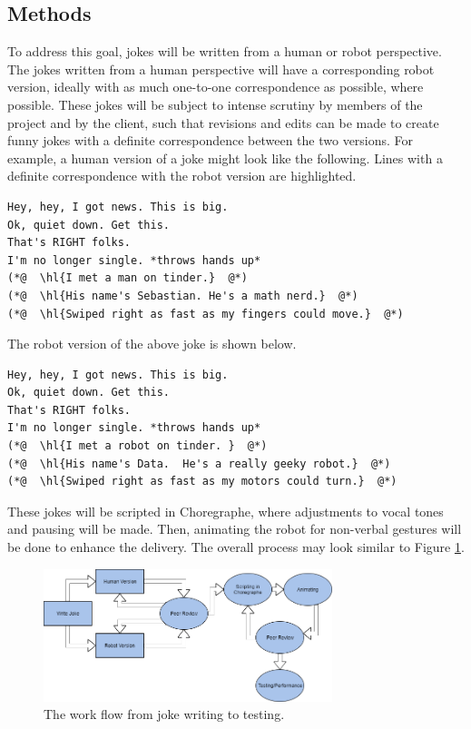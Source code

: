 \documentclass[onecolumn, draftclsnofoot,10pt, compsoc]{IEEEtran}
\begin{document}
\subsection{Methods}
To address this goal, jokes will be written from a human or robot perspective.
The jokes written from a human perspective will have a corresponding robot version, ideally with as much one-to-one correspondence as possible, where possible.
These jokes will be subject to intense scrutiny by members of the project and by the client, such that revisions and edits can be made to create funny jokes with a definite correspondence between the two versions.
For example, a human version of a joke might look like the following. Lines with a definite correspondence with the robot version are highlighted.

\begin{lstlisting}
Hey, hey, I got news. This is big.
Ok, quiet down. Get this.
That's RIGHT folks.
I'm no longer single. *throws hands up*
(*@  \hl{I met a man on tinder.}  @*)
(*@  \hl{His name's Sebastian. He's a math nerd.}  @*)
(*@  \hl{Swiped right as fast as my fingers could move.}  @*)
\end{lstlisting}

The robot version of the above joke is shown below.

\begin{lstlisting}
Hey, hey, I got news. This is big.
Ok, quiet down. Get this.
That's RIGHT folks.
I'm no longer single. *throws hands up*
(*@  \hl{I met a robot on tinder. }  @*)
(*@  \hl{His name's Data.  He's a really geeky robot.}  @*)
(*@  \hl{Swiped right as fast as my motors could turn.}  @*)
\end{lstlisting}

These jokes will be scripted in Choregraphe, where adjustments to vocal tones and pausing will be made.
Then, animating the robot for non-verbal gestures will be done to enhance the delivery.
The overall process may look similar to Figure \ref{fig:write_process}.

\begin{figure}[H]
  \centering
  \includegraphics[width=0.75\textwidth,height=0.75\textheight,keepaspectratio]{joke_writing_process}
  \caption{The work flow from joke writing to testing.}
	\label{fig:write_process}
\end{figure}
\end{document}
